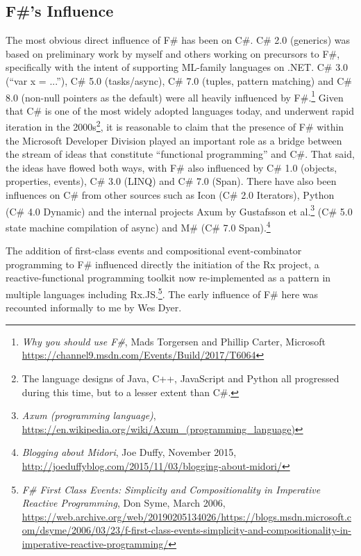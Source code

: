 \documentclass[acmsmall,review]{acmart}\settopmatter{printfolios=true,printccs=false,printacmref=false}
\begin{document}
\subsection*{F\#'s Influence}

The most obvious direct influence of F\# has been on C\#. C\# 2.0 (generics) was based on preliminary work
by myself and others working on precursors to F\#, specifically with the intent of supporting ML-family
languages on .NET. C\# 3.0 (“var x = ...”), C\# 5.0 (tasks/async), C\# 7.0 (tuples, pattern matching)
and C\# 8.0 (non-null pointers as the default) were all heavily influenced by F\#.\footnote{\textit{Why you should use F\#}, Mads Torgersen and Phillip Carter, Microsoft \url{https://channel9.msdn.com/Events/Build/2017/T6064}} Given that C\# is one of
the most widely adopted languages today, and underwent rapid iteration in the 2000s\footnote{The language designs of Java, C++, JavaScript and Python
all progressed during this time, but to a lesser extent than C\#.}, it is reasonable to
claim that the presence of F\# within the Microsoft Developer Division played an important role as a bridge
between the stream of ideas that constitute “functional programming” and C\#.   That said, the ideas have
flowed both ways, with F\# also influenced by C\# 1.0 (objects, properties, events), C\# 3.0 (LINQ) and C\# 7.0 (Span).
There have also been influences on C\# from other sources such as Icon (C\# 2.0 Iterators), Python (C\# 4.0 Dynamic) and
the internal projects Axum by Gustafsson et al.\footnote{\textit{ Axum (programming language)}, \url{https://en.wikipedia.org/wiki/Axum_(programming_language)}}  (C\# 5.0 state machine compilation of async) and M\#  (C\# 7.0 Span).\footnote{ \textit{Blogging about Midori}, Joe Duffy, November 2015, \url{http://joeduffyblog.com/2015/11/03/blogging-about-midori/}} 

The addition of first-class events and compositional event-combinator programming to F\# influenced directly the initiation
of the Rx project, a reactive-functional programming toolkit now re-implemented as a pattern in multiple languages
including Rx.JS.\footnote{\textit{F\# First Class Events: Simplicity and Compositionality in Imperative Reactive Programming}, Don Syme, March 2006, \url{https://web.archive.org/web/20190205134026/https://blogs.msdn.microsoft.com/dsyme/2006/03/23/f-first-class-events-simplicity-and-compositionality-in-imperative-reactive-programming/}}.   The early influence of F\# here was recounted informally to me by Wes Dyer. 
\end{document}
